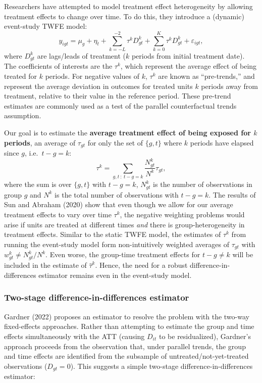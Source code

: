 Researchers have attempted to model treatment effect heterogeneity by allowing treatment effects to change over time. To do this, they introduce a (dynamic) event-study TWFE model:
\begin{equation}
  y_{igt} = \mu_g + \eta_t + \sum_{k = -L}^{-2} \tau^k D_{gt}^k + \sum_{k = 0}^{K} \tau^k D_{gt}^k + \varepsilon_{igt},
\end{equation}
where \(D_{gt}^k\) are lags/leads of treatment (\(k\) periods from initial treatment date). The coefficients of interests are the \(\tau^k\), which represent the average effect of being treated for \(k\) periods. For negative values of \(k\), \(\tau^k\) are known as ``pre-trends,'' and represent the average deviation in outcomes for treated units \(k\) periods away from treatment, relative to their value in the reference period. These pre-trend estimates are commonly used as a test of the parallel counterfactual trends assumption.

Our goal is to estimate the \textbf{average treatment effect of being exposed for \(k\) periods}, an average of \(\tau_{gt}\) for only the set of \(\{g,t\}\) where \(k\) periods have elapsed since \(g\), i.e.~\(t - g = k\):
\[
  \tau^k = \sum_{g,t \ : \ t - g = k} \frac{N_{gt}^k}{N^k} \tau_{gt},
\]
where the sum is over \(\{g,t\}\) with \(t - g = k\), \(N_{gt}^k\) is the number of observations in group \(g\) and \(N^k\) is the total number of observations with \(t - g = k\). The results of Sun and Abraham (2020) show that even though we allow for our average treatment effects to vary over time \(\tau^k\), the negative weighting problems would arise if units are treated at different times \emph{and} there is group-heterogeneity in treatment effects. Similar to the static TWFE model, the estimates of \(\tau^k\) from running the event-study model form non-intuitively weighted averages of \(\tau_{gt}\) with \(w_{gt}^k \neq N_{gt}^k/N^k\). Even worse, the group-time treatment effects for \(t-g \neq k\) will be included in the estimate of \(\hat{\tau}^k\). Hence, the need for a robust difference-in-differences estimator remains even in the event-study model.

\hypertarget{two-stage-difference-in-differences-estimator}{%
\subsubsection{Two-stage difference-in-differences estimator}\label{two-stage-difference-in-differences-estimator}}

Gardner (2022) proposes an estimator to resolve the problem with the two-way fixed-effects approaches. Rather than attempting to estimate the group and time effects simultaneously with the ATT (causing \(D_{it}\) to be residualized), Gardner's approach proceeds from the observation that, under parallel trends, the group and time effects are identified from the subsample of untreated/not-yet-treated observations (\(D_{gt} = 0\)). This suggests a simple two-stage difference-in-differences estimator:

